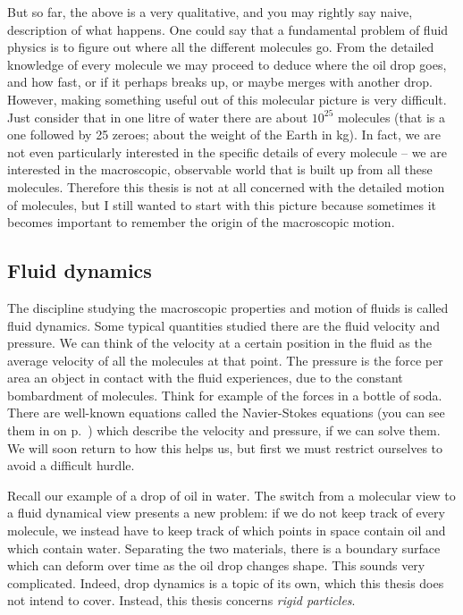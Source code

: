 \documentclass[thesis.tex]{subfiles}
\begin{document}
But so far, the above is a very qualitative, and you may rightly say naive, description of what happens. One could say that a fundamental problem of fluid physics is to figure out where all the different molecules go. From the detailed knowledge of every molecule we may proceed to deduce where the oil drop goes, and how fast, or if it perhaps breaks up, or maybe merges with another drop. However, making something useful out of this molecular picture is very difficult.
Just consider that in one litre of water there are about $10^{25}$ molecules (that is a one followed by 25 zeroes; about the weight of the Earth in kg). In fact, we are not even particularly interested in the specific details of every molecule -- we are interested in the macroscopic, observable world that is built up from all these molecules. Therefore this thesis is not at all concerned with the detailed motion of molecules, but I still wanted to start with this picture because sometimes it becomes important to remember the origin of the macroscopic motion.


\subsection*{Fluid dynamics}

The discipline studying the macroscopic properties and motion of fluids is called fluid dynamics. Some typical quantities studied there are the fluid velocity and pressure. We can think of the velocity at a certain position in the fluid as the average velocity of all the molecules at that point. The pressure is the force per area an object in contact with the fluid experiences, due to the constant bombardment of molecules. Think for example of the forces in a bottle of soda. There are well-known equations called the Navier-Stokes equations (you can see them in  on p.~\pageref{eqn:nsintro}) which describe the velocity and pressure, if we can solve them. We will soon return to how this helps us, but first we must restrict ourselves to avoid a difficult hurdle.

Recall our example of a drop of oil in water. The switch from a molecular view to a fluid dynamical view presents a new problem: if we do not keep track of every molecule, we instead have to keep track of which points in space contain oil and which contain water. Separating the two materials, there is a boundary surface which can deform over time as the oil drop changes shape. This sounds very complicated. Indeed, drop dynamics is a topic of its own, which this thesis does not intend to cover. Instead, this thesis concerns \emph{rigid particles}.
\end{document}
